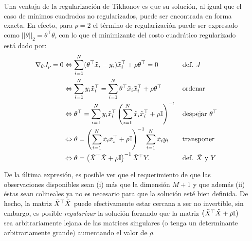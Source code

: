 Una ventaja de la regularización de Tikhonov es que su solución, al igual que el caso de mínimos cuadrados no regularizados, puede ser encontrada en forma exacta. En efecto, para $p=2$ el término de regularización puede ser expresado como $||\theta||_2 = \theta^\top\theta$, con lo que el minimizante del costo cuadrático regularizado está dado por: 
\begin{align}
\nabla_\theta J_\rho=0 &\Leftrightarrow \sum_{i=1}^N(\theta^\top \tilde{x}_i - y_i)\tilde{x}_i^\top + \rho\theta^\top=0  							&&\text{def. $J$}\nonumber\\  
&\Leftrightarrow \sum_{i=1}^Ny_i\tilde{x}_i^\top = \sum_{i=1}^N\theta^\top \tilde{x}_i\tilde{x}_i^\top + \rho\theta^\top					&&\text{ordenar}\nonumber\\
&\Leftrightarrow \theta^\top = \sum_{i=1}^Ny_i\tilde{x}_i^\top \left(\sum_{i=1}^N \tilde{x}_i\tilde{x}_i^\top + \rho {\mathbb I}\right)^{-1}	&&\text{despejar $\theta^\top$}\nonumber\\
&\Leftrightarrow \theta =  \left(\sum_{i=1}^N \tilde{x}_i\tilde{x}_i^\top +\rho {\mathbb I}\right)^{-1} \sum_{i=1}^N \tilde{x}_i y_i 		&&\text{transponer}\nonumber\\
&\Leftrightarrow \theta = \left(\tilde{X}^\top\tilde{X} +\rho {\mathbb I}\right)^{-1} \tilde{X}^\top Y.								&&\text{def. $\tilde{X}$ y $Y$} \label{eq:least_sq_soln}
\end{align}

De la última expresión, es posible ver que el requerimiento de que las observaciones disponibles sean (i) más que la dimensión $M+1$ y que además (ii) éstas sean colineales ya no es necesario para que la solución esté bien definida. De hecho, la matriz $\tilde{X}^\top\tilde{X}$ puede efectivamente estar cercana a ser no invertible, sin embargo, es posible \emph{regularizar} la solución forzando que la matriz $\left(\tilde{X}^\top\tilde{X} +\rho {\mathbb I}\right)$ sea arbitrariamente lejana de las matrices singulares (o tenga un determinante arbitrariamente grande) aumentando el valor de $\rho$. 




